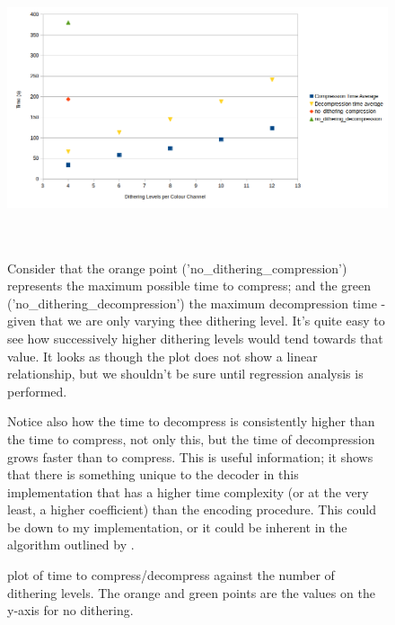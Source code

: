 \documentclass[]{article}
\begin{document}
\clearpage
\begin{figure}[!htbp]
	\begin{minipage}[b]{\textwidth}
		\includegraphics[width=\textwidth]{img/dithering-time}
		\caption{plot of time to compress/decompress against the number of dithering levels. The orange and green points are the values on the y-axis for no dithering.}
	\end{minipage}
	\\\\
	Consider that the orange point ('no\_dithering\_compression') represents the maximum possible time to compress; and the green ('no\_dithering\_decompression') the maximum decompression time - given that we are only varying thee dithering level. It's quite easy to see how successively higher dithering levels would tend towards that value. It looks as though the plot does not show a linear relationship, but we shouldn't be sure until regression analysis is performed.
	
	Notice also how the time to decompress is consistently higher than the time to compress, not only this, but the time of decompression grows faster than to compress. This is useful information; it shows that there is something unique to the decoder in this implementation that has a higher time complexity (or at the very least, a higher coefficient) than the encoding procedure. This could be down to my implementation, or it could be inherent in the algorithm outlined by \citet{Sayood06}.
\end{figure}
\end{document}

